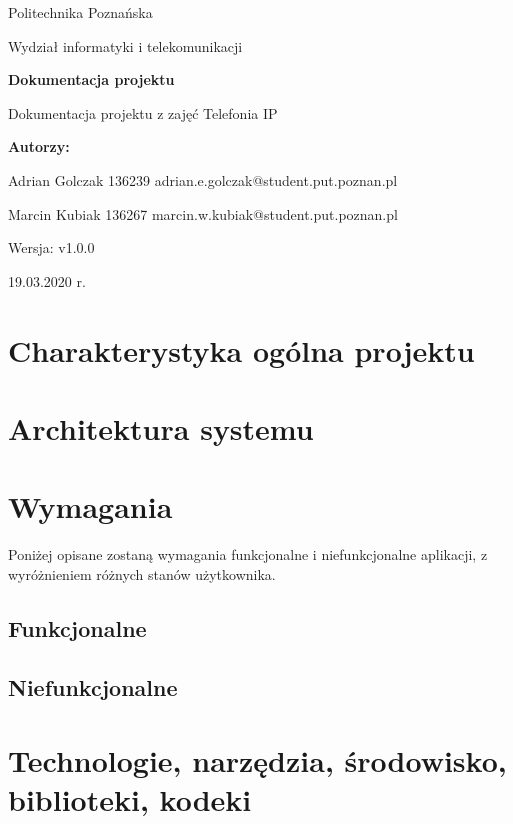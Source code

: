 \documentclass{article}
\newcommand{\version}{v1.0.0}
\begin{document}
\begin{titlepage}
		\begin{center}
			
						\LARGE
			Politechnika Poznańska
			
			\vspace{0.3cm}
			
			\large
			Wydział informatyki i telekomunikacji
			
			\vspace{3.0cm}
			\huge
			\textbf{Dokumentacja projektu}
			
			\vspace{0.5cm}
			
			\large
			Dokumentacja projektu z zajęć Telefonia IP
			
			\vspace{2.4cm}
			
			\LARGE
			\textbf{Autorzy:}
			
			\vspace{0.3cm}
			
			Adrian Golczak 136239
			adrian.e.golczak@student.put.poznan.pl
			
			\vspace{0.3cm}
			
			Marcin Kubiak 136267
			marcin.w.kubiak@student.put.poznan.pl
			
			\vfill
			
			\normalsize
			Wersja: \version
			
			\vspace{2cm}
			

			
			19.03.2020 r.
			
		\end{center}
\end{titlepage}
\tableofcontents
\newpage
	\section{Charakterystyka ogólna projektu}
	
	\section{Architektura systemu}
	
	\section{Wymagania}
	Poniżej opisane zostaną wymagania funkcjonalne i niefunkcjonalne aplikacji, z wyróżnieniem różnych stanów użytkownika.
	\subsection{Funkcjonalne}
	
	\subsection{Niefunkcjonalne}
	
	\section{Technologie, narzędzia, środowisko, biblioteki, kodeki}
	
\end{document}
